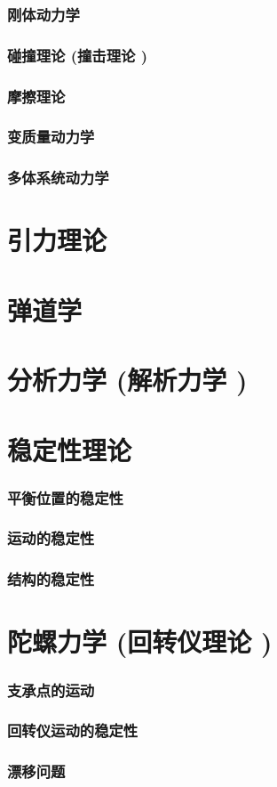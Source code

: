 \documentclass[UTF8]{../../06-Physics}
\begin{document}
    \subsection{刚体动力学}
    \subsection{碰撞理论 (撞击理论 )}
    \subsection{摩擦理论}
    \subsection{变质量动力学}
    \subsection{多体系统动力学}

\chapter{引力理论}
\chapter{弹道学}
\chapter{分析力学 (解析力学 )}

\chapter{稳定性理论}
    \subsection{平衡位置的稳定性}
    \subsection{运动的稳定性}
    \subsection{结构的稳定性}

\chapter{陀螺力学 (回转仪理论 )}
    \subsection{支承点的运动}
    \subsection{回转仪运动的稳定性}
    \subsection{漂移问题}
\end{document}
